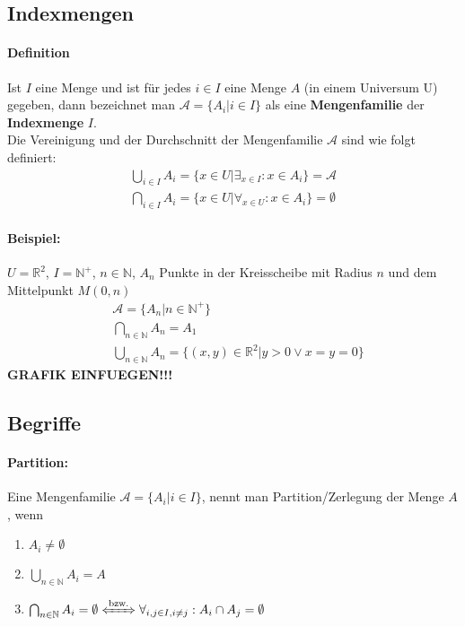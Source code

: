 \subsection{Indexmengen}
\paragraph{Definition}Ist $I$ eine Menge und ist für jedes $i\in I$ eine Menge $A$ (in einem Universum U) gegeben, dann bezeichnet man
$\mathcal{A}=\{A_i|i\in I\}$ als eine \textbf{Mengenfamilie} der \textbf{Indexmenge} $I$.\\
Die Vereinigung und der Durchschnitt der Mengenfamilie $\mathcal{A}$ sind wie folgt definiert:
\begin{align*}
\bigcup_{i\in I} A_i = \{x\in U | \exists_{x\in I}: x\in A_i\}=\mathcal{A} \\
\bigcap_{i\in I} A_i = \{x\in U | \forall_{x\in U}: x\in A_i\} =\emptyset
\end{align*}

\paragraph{Beispiel:} $U=\mathbb{R}^2$, $I=\mathbb{N}^+$, $n\in\mathbb{N}$, $A_n$ Punkte in der Kreisscheibe mit Radius $n$ und dem Mittelpunkt $M(0,n)$
\begin{align*}
&\mathcal{A}=\{A_n|n\in \mathbb{N}^+\} \\
&\bigcap_{n\in\mathbb{N}}A_n=A_1 \\
&\bigcup_{n\in\mathbb{N}}A_n=\{ (x,y)\in\mathbb{R}^2 | y>0 \lor x=y=0\}
\end{align*}
\textbf{GRAFIK EINFUEGEN!!!}
\subsection{Begriffe}
\paragraph{Partition:}Eine Mengenfamilie $\mathcal{A}=\{A_i | i\in I\}$, nennt man Partition/Zerlegung der Menge $A$, wenn
\begin{enumerate}
\item $A_i \neq \emptyset$
\item $\bigcup_{n\in\mathbb{N}}A_i=A$
\item $\bigcap_{n\in\mathbb{N}}A_i=\emptyset \xLeftrightarrow{\text{bzw.}} \forall_{i,j\in I,i\neq j}:A_i\cap A_j=\emptyset$
\end{enumerate}
